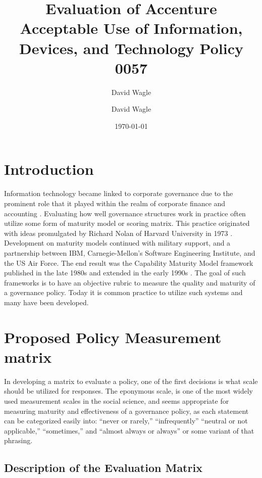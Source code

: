 \documentclass[stu]{apa7}
\title{Evaluation of Accenture Acceptable Use of Information, Devices, and Technology Policy 0057}
\author{David Wagle}
\affiliation{School of Business, Northcentral University}
\author{David Wagle}
\date{\today}
\title{}
\begin{document}
\maketitle

\section{Introduction}
\label{sec:org7d2fb93}
Information technology became linked to corporate governance due to the prominent role that it played within the realm of corporate finance and accounting \parencite{holderMaterialWeaknessesInformation2016,liInternalExternalInfluences2007}. Evaluating how well governance structures work in practice often utilize some form of maturity model or scoring matrix. This practice originated with ideas promulgated by Richard Nolan of Harvard University in 1973 \parencite{nolanManagingComputerResource1973}. Development on maturity models continued with military support, and a partnership between IBM, Carnegie-Mellon's Software Engineering Institute, and the US Air Force. The end result was the Capability Maturity Model framework published in the late 1980s and extended in the early 1990s \parencite{caralliMaturityModels1012012}. The goal of such frameworks is to have an objective rubric to measure the quality and maturity of a governance policy. Today it is common practice to utilize such systems and many have been developed.

\section{Proposed Policy Measurement matrix}
\label{sec:orgc3d7456}

In developing a matrix to evaluate a policy, one of the first decisions is what scale should be utilized for responses. The eponymous \textcite{likertTechniqueMeasurementAttitudes1932} scale, is one of the most widely used measurement scales in the social science, and seems appropriate for measuring maturity and effectiveness of a governance policy, as each statement can be categorized easily into: ``never or rarely,'' ``infrequently'' ``neutral or not applicable,'' ``sometimes,'' and ``almost always or always'' or some variant of that phrasing.

\subsection{Description of the Evaluation Matrix}
\label{sec:orgbe4d2c8}
\end{document}
